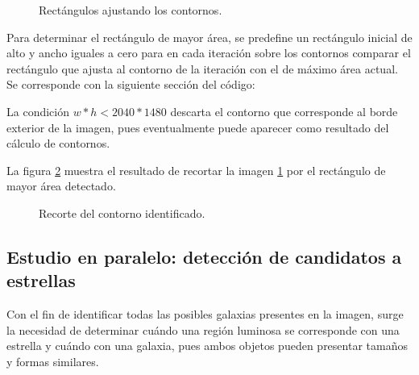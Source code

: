 \documentclass[a4paper,12pt]{article}
\begin{document}
\begin{figure}[h!]
\centering
{}
\caption{Rectángulos ajustando los contornos.}
\label{fig:img3}
\end{figure}
Para determinar el rectángulo de mayor área, se predefine un rectángulo inicial de alto y ancho iguales a cero para en cada iteración sobre los contornos comparar el rectángulo que ajusta al contorno de la iteración con el de máximo área actual. Se corresponde con la siguiente sección del código:

La condición $w*h<2040*1480$ descarta el contorno que corresponde al borde exterior de la imagen, pues eventualmente puede aparecer como resultado del cálculo de contornos.

La figura \ref{fig:img3Rect} muestra el resultado de recortar la imagen \ref{fig:img3} por el rectángulo de mayor área detectado.

\begin{figure}[h!]
\centering
{}
\caption{Recorte del contorno identificado.}
\label{fig:img3Rect}
\end{figure}



\subsection{Estudio en paralelo: detección de candidatos a estrellas}
Con el fin de identificar todas las posibles galaxias presentes en la imagen, surge la necesidad de determinar cuándo una región luminosa se corresponde con una estrella y cuándo con una galaxia, pues ambos objetos pueden presentar tamaños y formas similares.
\end{document}
